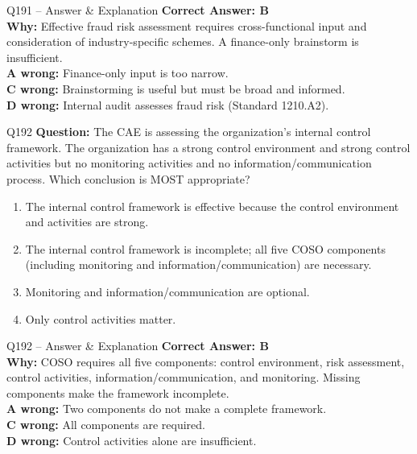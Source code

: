 \documentclass[aspectratio=169,10pt]{beamer}
\begin{document}
	\begin{frame}[t]{Q191 -- Answer \& Explanation}
		\small
		\textbf{Correct Answer: B} \\[4pt]
		\textbf{Why:} Effective fraud risk assessment requires cross-functional input and consideration of industry-specific schemes. A finance-only brainstorm is insufficient. \\[4pt]
		\textbf{A wrong:} Finance-only input is too narrow. \\[2pt]
		\textbf{C wrong:} Brainstorming is useful but must be broad and informed. \\[2pt]
		\textbf{D wrong:} Internal audit assesses fraud risk (Standard 1210.A2).
	\end{frame}
	
	\begin{frame}[t]{Q192}
		\small
		\textbf{Question:} The CAE is assessing the organization's internal control framework. The organization has a strong control environment and strong control activities but no monitoring activities and no information/communication process. Which conclusion is MOST appropriate?
		\begin{enumerate}[label=\Alph*.,itemsep=1pt,topsep=2pt]
			\item The internal control framework is effective because the control environment and activities are strong.
			\item The internal control framework is incomplete; all five COSO components (including monitoring and information/communication) are necessary.
			\item Monitoring and information/communication are optional.
			\item Only control activities matter.
		\end{enumerate}
	\end{frame}
	
	\begin{frame}[t]{Q192 -- Answer \& Explanation}
		\small
		\textbf{Correct Answer: B} \\[4pt]
		\textbf{Why:} COSO requires all five components: control environment, risk assessment, control activities, information/communication, and monitoring. Missing components make the framework incomplete. \\[4pt]
		\textbf{A wrong:} Two components do not make a complete framework. \\[2pt]
		\textbf{C wrong:} All components are required. \\[2pt]
		\textbf{D wrong:} Control activities alone are insufficient.
	\end{frame}
	
\end{document}
